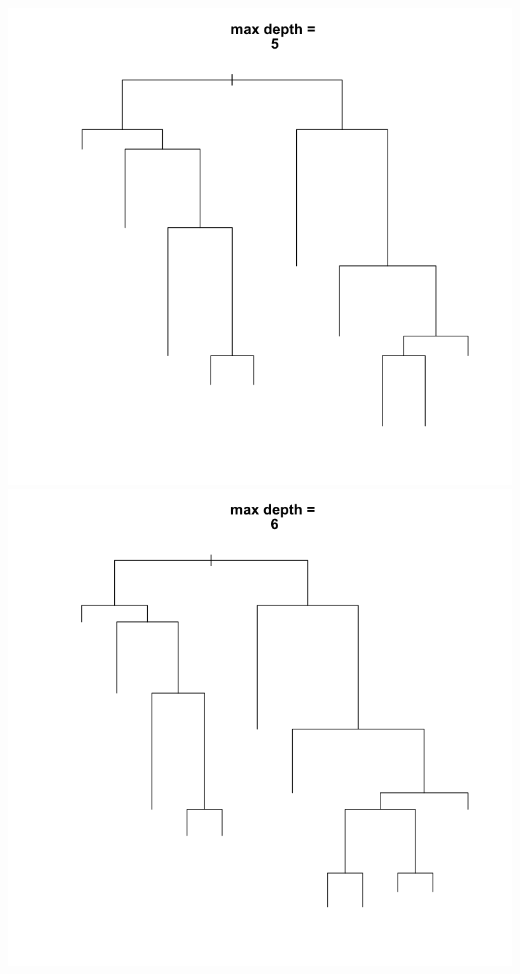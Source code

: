 \documentclass[11pt]{article}
\begin{document}
\begin{center}
\includegraphics[scale=0.25]{images/mdepth=5}
\includegraphics[scale=0.25]{images/mdepth=6}
\end{center}
\end{document}
